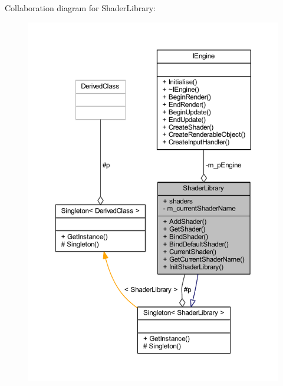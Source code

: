 Collaboration diagram for Shader\+Library\+:\nopagebreak
\begin{figure}[H]
\begin{center}
\leavevmode
\includegraphics[width=350pt]{struct_shader_library__coll__graph}
\end{center}
\end{figure}
